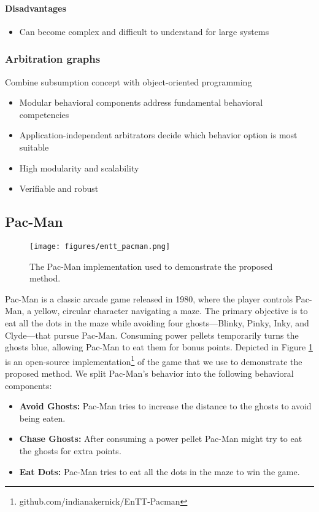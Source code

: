 \paragraph*{Disadvantages}
\begin{itemize}
    \item Can become complex and difficult to understand for large systems
\end{itemize}

\subsubsection*{Arbitration graphs}
Combine subsumption concept with object-oriented programming \cite{lauer_cognitive_2010}
\begin{itemize}
    \item Modular behavioral components address fundamental behavioral competencies
    \item Application-independent arbitrators decide which behavior option is most suitable
    \item High modularity and scalability
    \item Verifiable and robust
\end{itemize}

\subsection{Pac-Man}

\begin{figure}
    \centering
    \texttt{[image: figures/entt\_pacman.png]}
    \caption{The Pac-Man implementation used to demonstrate the proposed method.}
    \label{fig:entt-pacman}
\end{figure}
Pac-Man is a classic arcade game released in 1980, where the player controls Pac-Man, a yellow, circular character navigating a maze.
The primary objective is to eat all the dots in the maze while avoiding four ghosts—Blinky, Pinky, Inky, and Clyde—that pursue Pac-Man.
Consuming power pellets temporarily turns the ghosts blue, allowing Pac-Man to eat them for bonus points.
Depicted in Figure \ref{fig:entt-pacman} is an open-source implementation\footnote{github.com/indianakernick/EnTT-Pacman} of the game that we use to demonstrate the proposed method.
We split Pac-Man's behavior into the following behavioral components:

\begin{itemize}
    \item \textbf{Avoid Ghosts:} Pac-Man tries to increase the distance to the ghosts to avoid being eaten.
    \item \textbf{Chase Ghosts:} After consuming a power pellet Pac-Man might try to eat the ghosts for extra points.
    \item \textbf{Eat Dots:} Pac-Man tries to eat all the dots in the maze to win the game.
\end{itemize}

